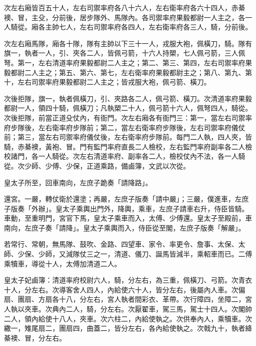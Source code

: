 \begin{pinyinscope}
 次左右廂皆百五十人，左右司禦率府各八十六人，左右衛率府各六十四人，赤綦襖、冒，主殳，分前後，居步隊外、馬隊內。各司禦率府果毅都尉一人主之，各一人騎從。廂各主帥七人，左右司禦率府各四人，左右衛率府各三人，騎，分前後。



 次左右廂馬隊，廂各十隊，隊有主帥以下三十一人，戎服大袍，佩橫刀，騎。隊有旗一，執者一人，引、夾各二人，皆佩弓箭，十六人持槊，七人佩弓箭，三人佩弩。第一，左右清道率府果毅都尉二人主之；第二、第三、第四，左右司禦率府果毅都尉二人主之；第五、第六、第七，左右衛率府果毅都尉主之；第八、第九、第十，左右司禦率府果毅都尉二人主之；皆戎服大袍，佩弓箭、橫刀。



 次後拒隊，旗一，執者佩橫刀，引、夾路各二人，佩弓箭、橫刀。次清道率府果毅都尉一人，領四十騎，佩橫刀；凡執槊二十人，佩弓箭十六人，佩弩四人，騎從。次後拒隊，前當正道殳仗內，有衙門。次左右廂各有衙門三：第一，當左右司禦率府步隊後，左右衛率府步隊前；第二，當左右衛率府步隊後，左右司禦率府儀仗前；第三，當左右司禦率府儀仗後，左右衛率府步隊前。每門二人執，四人夾，皆騎，赤綦襖，黃袍、冒。門有監門率府直長二人檢校，左右監門率府副率各二人檢校諸門，各一人騎從。次左右清道率府、副率各二人，檢校仗內不法，各一人騎從。次少師、少傅、少保，正道乘路，備鹵簿，文武以次從。



 皇太子所至，回車南向，左庶子跪奏「請降路」。



 還宮。一嚴，轉仗衛於還塗；再嚴，左庶子版奏「請中嚴」；三嚴，僕進車，左庶子版奏「外辦」。皇太子乘輿出門外，降輿，乘車，左庶子請車右升，侍臣皆騎。車動，至重明門，宮官下馬，皇太子乘車而入，太傅、少傅還。皇太子至殿前，車南向，左庶子奏「請降」。皇太子乘輿而入，侍臣從至閣，左庶子版奏「解嚴」。



 若常行、常朝，無馬隊、鼓吹、金路、四望車、家令、率更令、詹事、太保、太師、少保、少師，又減隊仗三之一，清道、儀刀、誕馬皆減半，乘軺車而已。二傅乘犢車，導從十人，太傅加清道二人。



 皇太子妃鹵簿：清道率府校尉六人，騎，分左右，為三重，佩橫刀、弓箭。次青衣十人，分左右。次導客舍人四人，內給使六十人，皆分左右，後屬內人車。次偏扇、團扇、方扇各十八，分左右，宮人執者間彩衣、革帶。次行障四，坐障二，宮人執以夾車。次典內二人，騎，分左右。次厭翟車，駕三馬，駕士十四人。次閣帥二人，領內給使十八人，夾車。次六柱二，內給使執之。次供奉內人，乘犢車。次繖一，雉尾扇二，團扇四，曲蓋二，皆分左右，各內給使執之。次戟九十，執者絳綦襖、冒，分左右。




\end{pinyinscope}
